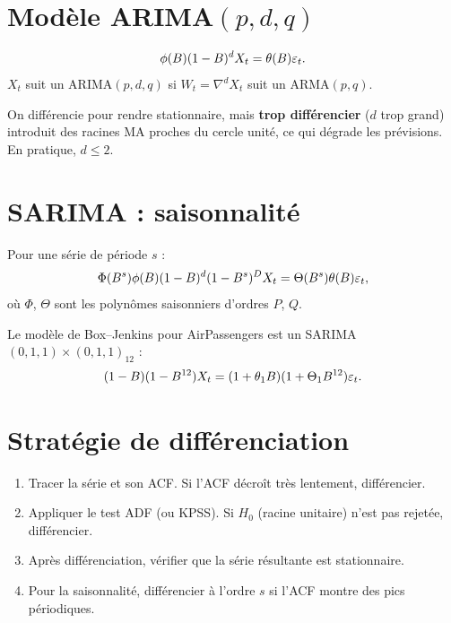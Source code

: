 \section{Mod\`ele ARIMA$(p,d,q)$}

\begin{definition}[ARIMA$(p,d,q)$]
\[
\phi(B)(1-B)^d X_t = \theta(B)\varepsilon_t.
\]
$X_t$ suit un ARIMA$(p,d,q)$ si $W_t = \nabla^d X_t$ suit un ARMA$(p,q)$.
\end{definition}

\begin{attention}
On diff\'erencie pour rendre stationnaire, mais \textbf{trop diff\'erencier} ($d$ trop grand) introduit des racines MA proches du cercle unit\'e, ce qui d\'egrade les pr\'evisions. En pratique, $d\leq 2$.
\end{attention}

\section{SARIMA : saisonnalit\'e}

\begin{definition}
Pour une s\'erie de p\'eriode $s$ :
\[
\Phi(B^s)\phi(B)(1-B)^d(1-B^s)^D X_t = \Theta(B^s)\theta(B)\varepsilon_t,
\]
o\`u $\Phi$, $\Theta$ sont les polyn\^omes saisonniers d'ordres $P$, $Q$.
\end{definition}

\begin{exemple}
Le mod\`ele de Box--Jenkins pour AirPassengers est un SARIMA$(0,1,1)\times(0,1,1)_{12}$ :
\[
(1-B)(1-B^{12})X_t = (1+\theta_1 B)(1+\Theta_1 B^{12})\varepsilon_t.
\]
\end{exemple}

\section{Strat\'egie de diff\'erenciation}

\begin{methode}
\begin{enumerate}
\item Tracer la s\'erie et son ACF. Si l'ACF d\'ecro\^it tr\`es lentement, diff\'erencier.
\item Appliquer le test ADF (ou KPSS). Si $H_0$ (racine unitaire) n'est pas rejet\'ee, diff\'erencier.
\item Apr\`es diff\'erenciation, v\'erifier que la s\'erie r\'esultante est stationnaire.
\item Pour la saisonnalit\'e, diff\'erencier \`a l'ordre $s$ si l'ACF montre des pics p\'eriodiques.
\end{enumerate}
\end{methode}

